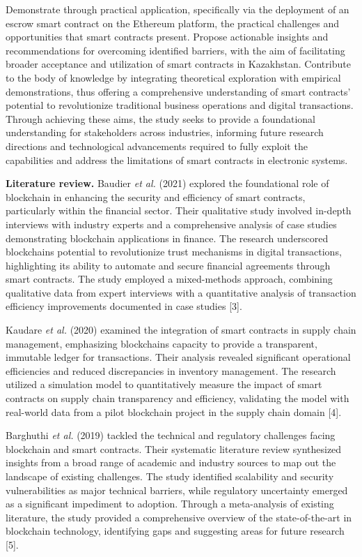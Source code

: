 Demonstrate through practical application, specifically via the
deployment of an escrow smart contract on the Ethereum platform, the
practical challenges and opportunities that smart contracts present.
Propose actionable insights and recommendations for overcoming
identified barriers, with the aim of facilitating broader acceptance and
utilization of smart contracts in Kazakhstan. Contribute to the body of
knowledge by integrating theoretical exploration with empirical
demonstrations, thus offering a comprehensive understanding of smart
contracts' potential to revolutionize traditional business operations
and digital transactions. Through achieving these aims, the study seeks
to provide a foundational understanding for stakeholders across
industries, informing future research directions and technological
advancements required to fully exploit the capabilities and address the
limitations of smart contracts in electronic systems.

\textbf{Literature review.} Baudier \emph{et al.} (2021) explored the
foundational role of blockchain in enhancing the security and efficiency
of smart contracts, particularly within the financial sector. Their
qualitative study involved in-depth interviews with industry experts and
a comprehensive analysis of case studies demonstrating blockchain
applications in finance. The research underscored
blockchain\textquotesingle s potential to revolutionize trust mechanisms
in digital transactions, highlighting its ability to automate and secure
financial agreements through smart contracts. The study employed a
mixed-methods approach, combining qualitative data from expert
interviews with a quantitative analysis of transaction efficiency
improvements documented in case studies {[}3{]}.

Kaudare \emph{et al.} (2020) examined the integration of smart contracts
in supply chain management, emphasizing blockchain\textquotesingle s
capacity to provide a transparent, immutable ledger for transactions.
Their analysis revealed significant operational efficiencies and reduced
discrepancies in inventory management. The research utilized a
simulation model to quantitatively measure the impact of smart contracts
on supply chain transparency and efficiency, validating the model with
real-world data from a pilot blockchain project in the supply chain
domain {[}4{]}.

Barghuthi \emph{et al.} (2019) tackled the technical and regulatory
challenges facing blockchain and smart contracts. Their systematic
literature review synthesized insights from a broad range of academic
and industry sources to map out the landscape of existing challenges.
The study identified scalability and security vulnerabilities as major
technical barriers, while regulatory uncertainty emerged as a
significant impediment to adoption. Through a meta-analysis of existing
literature, the study provided a comprehensive overview of the
state-of-the-art in blockchain technology, identifying gaps and
suggesting areas for future research {[}5{]}.

